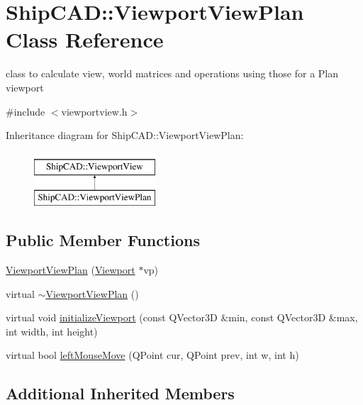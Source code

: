 \hypertarget{classShipCAD_1_1ViewportViewPlan}{\section{Ship\-C\-A\-D\-:\-:Viewport\-View\-Plan Class Reference}
\label{classShipCAD_1_1ViewportViewPlan}
}


class to calculate view, world matrices and operations using those for a Plan viewport  




{\ttfamily \#include $<$viewportview.\-h$>$}

Inheritance diagram for Ship\-C\-A\-D\-:\-:Viewport\-View\-Plan\-:\begin{figure}[H]
\begin{center}
\leavevmode
\includegraphics[height=2.000000cm]{classShipCAD_1_1ViewportViewPlan}
\end{center}
\end{figure}
\subsection*{Public Member Functions}
\begin{DoxyCompactItemize}
\item 
\hyperlink{classShipCAD_1_1ViewportViewPlan_a71852fca01ee2c986927f15b37246567}{Viewport\-View\-Plan} (\hyperlink{classShipCAD_1_1Viewport}{Viewport} $\ast$vp)
\item 
virtual \hyperlink{classShipCAD_1_1ViewportViewPlan_aa00e0a2e6845f8c1382ab834879c2bfd}{$\sim$\-Viewport\-View\-Plan} ()
\item 
virtual void \hyperlink{classShipCAD_1_1ViewportViewPlan_a05836d5f48d28a0681a1a3214dc4aeac}{initialize\-Viewport} (const Q\-Vector3\-D \&min, const Q\-Vector3\-D \&max, int width, int height)
\item 
virtual bool \hyperlink{classShipCAD_1_1ViewportViewPlan_a43c15e93e5dd097e0c251c9c4558717c}{left\-Mouse\-Move} (Q\-Point cur, Q\-Point prev, int w, int h)
\end{DoxyCompactItemize}
\subsection*{Additional Inherited Members}


